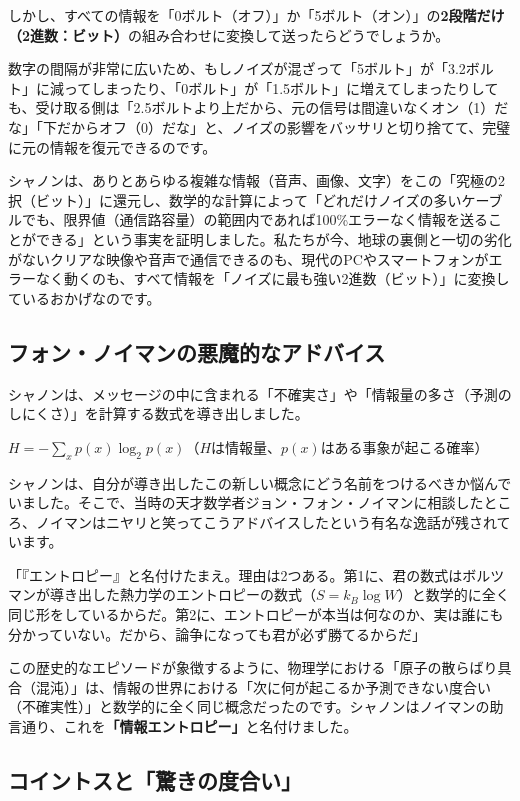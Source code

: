 しかし、すべての情報を「0ボルト（オフ）」か「5ボルト（オン）」の\textbf{2段階だけ（2進数：ビット）}の組み合わせに変換して送ったらどうでしょうか。

数字の間隔が非常に広いため、もしノイズが混ざって「5ボルト」が「3.2ボルト」に減ってしまったり、「0ボルト」が「1.5ボルト」に増えてしまったりしても、受け取る側は「2.5ボルトより上だから、元の信号は間違いなくオン（1）だな」「下だからオフ（0）だな」と、ノイズの影響をバッサリと切り捨てて、完璧に元の情報を復元できるのです。

シャノンは、ありとあらゆる複雑な情報（音声、画像、文字）をこの「究極の2択（ビット）」に還元し、数学的な計算によって「どれだけノイズの多いケーブルでも、限界値（通信路容量）の範囲内であれば100\%エラーなく情報を送ることができる」という事実を証明しました。私たちが今、地球の裏側と一切の劣化がないクリアな映像や音声で通信できるのも、現代のPCやスマートフォンがエラーなく動くのも、すべて情報を「ノイズに最も強い2進数（ビット）」に変換しているおかげなのです。

\subsection{フォン・ノイマンの悪魔的なアドバイス}

シャノンは、メッセージの中に含まれる「不確実さ」や「情報量の多さ（予測のしにくさ）」を計算する数式を導き出しました。

\(H=-\sum_x p(x)\log_2 p(x)\)（\(H\)は情報量、\(p(x)\)はある事象が起こる確率）

シャノンは、自分が導き出したこの新しい概念にどう名前をつけるべきか悩んでいました。そこで、当時の天才数学者ジョン・フォン・ノイマンに相談したところ、ノイマンはニヤリと笑ってこうアドバイスしたという有名な逸話が残されています。

「『エントロピー』と名付けたまえ。理由は2つある。第1に、君の数式はボルツマンが導き出した熱力学のエントロピーの数式（\(S=k_B\log W\)）と数学的に全く同じ形をしているからだ。第2に、エントロピーが本当は何なのか、実は誰にも分かっていない。だから、論争になっても君が必ず勝てるからだ」

この歴史的なエピソードが象徴するように、物理学における「原子の散らばり具合（混沌）」は、情報の世界における「次に何が起こるか予測できない度合い（不確実性）」と数学的に全く同じ概念だったのです。シャノンはノイマンの助言通り、これを\textbf{「情報エントロピー」}と名付けました。

\subsection{コイントスと「驚きの度合い」}


